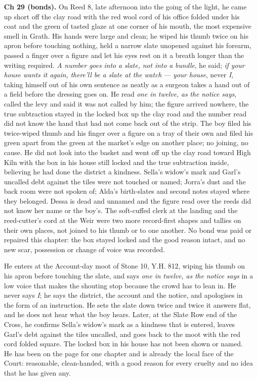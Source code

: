 \documentclass{design/chronicle}
\begin{document}
{\textbf{Ch 29 (bonds).} On Reed 8, late afternoon into the going of the light, he came up short off the clay road with the red wool cord of his office folded under his coat and the green of tasted glaze at one corner of his mouth, the most expensive smell in Grath. His hands were large and clean; he wiped his thumb twice on his apron before touching nothing, held a narrow slate unopened against his forearm, passed a finger over a figure and let his eyes rest on it a breath longer than the writing required. \emph{A number goes into a slate, not into a bundle}, he said; \emph{if your house wants it again, there’ll be a slate at the watch} — \emph{your house}, never \emph{I}, taking himself out of his own sentence as neatly as a surgeon takes a hand out of a field before the dressing goes on. He read \emph{one in twelve, as the notice says}, called the levy and said it was not called by him; the figure arrived nowhere, the true subtraction stayed in the locked box up the clay road and the number read did not know the hand that had not come back out of the strip. The boy filed his twice-wiped thumb and his finger over a figure on a tray of their own and filed his green apart from the green at the market’s edge on another place; no joining, no cause. He did not look into the basket and went off up the clay road toward High Kiln with the box in his house still locked and the true subtraction inside, believing he had done the district a kindness. Sella’s widow’s mark and Garl’s uncalled debt against the tiles were not touched or named; Jorra’s dust and the back room were not spoken of; Alda’s birth-slates and second notes stayed where they belonged. Dessa is dead and unnamed and the figure read over the reeds did not know her name or the boy’s. The soft-cuffed clerk at the landing and the reed-cutter’s cord at the Weir were two more record-first shapes and tallies on their own places, not joined to his thumb or to one another. No bond was paid or repaired this chapter: the box stayed locked and the good reason intact, and no new scar, possession or change of voice was recorded.

He enters at the Account-day moot of Stone 10, Y.H. 812, wiping his thumb on his apron before touching the slate, and says \emph{one in twelve, as the notice says} in a low voice that makes the shouting stop because the crowd has to lean in. He never says \emph{I}; he says the district, the account and the notice, and apologises in the form of an instruction. He sets the slate down twice and twice it answers flat, and he does not hear what the boy hears. Later, at the Slate Row end of the Cross, he confirms Sella’s widow’s mark as a kindness that is entered, leaves Garl’s debt against the tiles uncalled, and goes back to the moot with the red cord folded square. The locked box in his house has not been shown or named. He has been on the page for one chapter and is already the local face of the Court: reasonable, clean-handed, with a good reason for every cruelty and no idea that he has given any.

}
\end{document}
